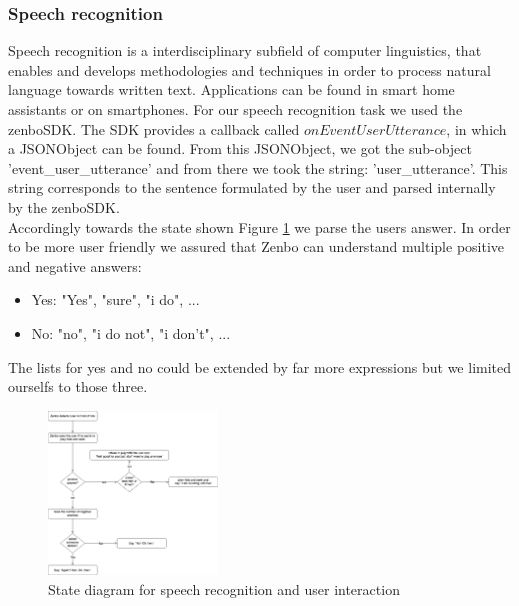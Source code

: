 \documentclass[conference]{IEEEtran}
\begin{document}
\subsubsection{Speech recognition} \label{sec:speechreconition}
Speech recognition is a interdisciplinary subfield of computer linguistics, that enables and develops methodologies and techniques in order to process 
natural language towards written text. \cite{b4}  Applications can be found in smart home assistants or on smartphones.
For our speech recognition task we used the zenboSDK. The SDK provides a callback called $onEventUserUtterance$, in which a JSONObject can be found.
From this JSONObject, we got the sub-object 'event\_user\_utterance' and from there we took the string: 'user\_utterance'. This string 
corresponds to the sentence formulated by the user and parsed internally by the zenboSDK.\\
Accordingly towards the state shown Figure \ref{fig:zenboSpeech} we parse the users answer.
In order to be more user friendly we assured that Zenbo can understand multiple positive and negative answers:
\begin{itemize}
  \item Yes: "Yes", "sure", "i do", ...
  \item No: "no", "i do not", "i don't", ...
\end{itemize}
The lists for yes and no could be extended by far more expressions but we limited ourselfs to those three.\\
\begin{figure}  \label{fig:zenboSpeech}
	\begin{center}
		\includegraphics[width=0.4\textwidth]{pics/ZenboSpeech.png}
	\end{center}
	\caption{State diagram for speech recognition and user interaction}
\end{figure}\\
\end{document}
